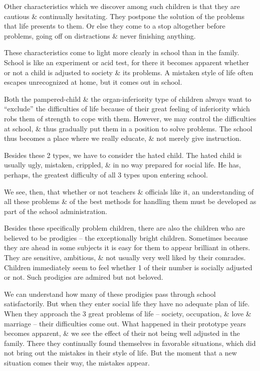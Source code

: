 \documentclass{article}
\numberwithin{equation}{section}
\begin{document}
Other characteristics which we discover among such children is that they are cautious \& continually hesitating. They postpone the solution of the problems that life presents to them. Or else they come to a stop altogether before problems, going off on distractions \& never finishing anything.

These characteristics come to light more clearly in school than in the family. School is like an experiment or acid test, for there it becomes apparent whether or not a child is adjusted to society \& its problems. A mistaken style of life often escapes unrecognized at home, but it comes out in school.

Both the pampered-child \& the organ-inferiority type of children always want to ``exclude'' the difficulties of life because of their great feeling of inferiority which robs them of strength to cope with them. However, we may control the difficulties at school, \& thus gradually put them in a position to solve problems. The school thus becomes a place where we really educate, \& not merely give instruction.

Besides these 2 types, we have to consider the hated child. The hated child is usually ugly, mistaken, crippled, \& in no way prepared for social life. He has, perhaps, the greatest difficulty of all 3 types upon entering school.

We see, then, that whether or not teachers \& officials like it, an understanding of all these problems \& of the best methods for handling them must be developed as part of the school administration.

Besides these specifically problem children, there are also the children who are believed to be prodigies -- the exceptionally bright children. Sometimes because they are ahead in some subjects it is easy for them to appear brilliant in others. They are sensitive, ambitious, \& not usually very well liked by their comrades. Children immediately seem to feel whether 1 of their number is socially adjusted or not. Such prodigies are admired but not beloved.

We can understand how many of these prodigies pass through school satisfactorily. But when they enter social life they have no adequate plan of life. When they approach the 3 great problems of life -- society, occupation, \& love \& marriage -- their difficulties come out. What happened in their prototype years becomes apparent, \& we see the effect of their not being well adjusted in the family. There they continually found themselves in favorable situations, which did not bring out the mistakes in their style of life. But the moment that a new situation comes their way, the mistakes appear.
\end{document}
